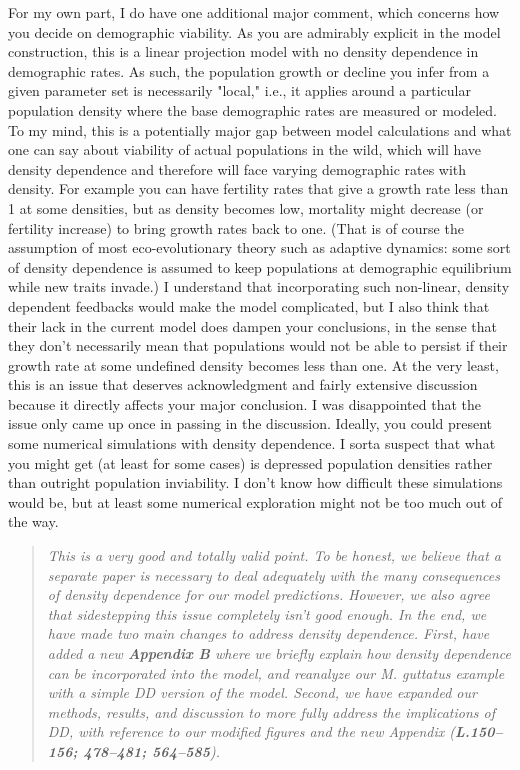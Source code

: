 \documentclass[11pt]{article}
\begin{document}
For my own part, I do have one additional major comment, which concerns how you decide on demographic viability. As you are admirably explicit in the model construction, this is a linear projection model with no density dependence in demographic rates. As such, the population growth or decline you infer from a given parameter set is necessarily "local," i.e., it applies around a particular population density where the base demographic rates are measured or modeled. To my mind, this is a potentially major gap between model calculations and what one can say about viability of actual populations in the wild, which will have density dependence and therefore will face varying demographic rates with density. For example you can have fertility rates that give a growth rate less than 1 at some densities, but as density becomes low, mortality might decrease (or fertility increase) to bring growth rates back to one. (That is of course the assumption of most eco-evolutionary theory such as adaptive dynamics: some sort of density dependence is assumed to keep populations at demographic equilibrium while new traits invade.) I understand that incorporating such non-linear, density dependent feedbacks would make the model complicated, but I also think that their lack in the current model does dampen your conclusions, in the sense that they don’t necessarily mean that populations would not be able to persist if their growth rate at some undefined density becomes less than one. At the very least, this is an issue that deserves acknowledgment and fairly extensive discussion because it directly affects your major conclusion. I was disappointed that the issue only came up once in passing in the discussion. Ideally, you could present some numerical simulations with density dependence. I sorta suspect that what you might get (at least for some cases) is depressed population densities rather than outright population inviability. I don’t know how difficult these simulations would be, but at least some numerical exploration might not be too much out of the way.

\begin{quote}
	{\itshape This is a very good and totally valid point. To be honest, we believe that a separate paper is necessary to deal adequately with the many consequences of density dependence for our model predictions. However, we also agree that sidestepping this issue completely isn't good enough. In the end, we have made two main changes to address density dependence. First, have added a new {\bf Appendix B} where we briefly explain how density dependence can be incorporated into the model, and reanalyze our {\itshape M. guttatus} example with a simple DD version of the model. Second, we have expanded our methods, results, and discussion to more fully address the implications of DD, with reference to our modified figures and the new Appendix ({\bf L.150--156; 478--481; 564--585}).}
\end{quote}
\end{document}
